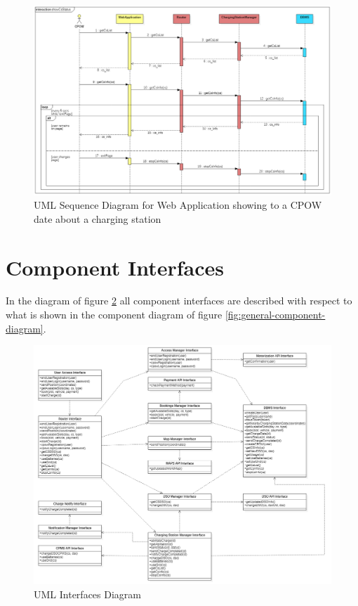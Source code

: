 \documentclass[a4paper]{report}
\begin{document}
\begin{landscape}
\begin{figure}[hp]
\centering
\includegraphics[scale=0.6]{img/sequenceShowCsStatus.png}
\caption{UML Sequence Diagram for Web Application showing to a CPOW date about a charging station}
\label{fig:seq-csStatus}
\end{figure}
\end{landscape}

\section{Component Interfaces}
In the diagram of figure \ref{fig:componentInterfaces} all component interfaces are described with respect to what is shown in the component diagram of figure \ref{fig:general-component-diagram}.

\begin{figure}[htp]
\includegraphics[scale=0.55]{img/componentInterfaces.png}
\caption{UML Interfaces Diagram}
\label{fig:componentInterfaces}
\end{figure}
\end{document}
